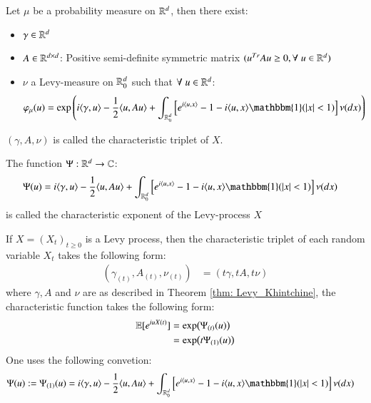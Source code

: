 \begin{theorem}
\label{thm: Levy_Khintchine}
Let $\mu$ be a probability measure on $\mathbb{R}^{d}$, then there exist: 
\begin{itemize}[leftmargin =*]
    \item $\gamma \in \mathbb{R}^{d}$
    \item $A \in \mathbb{R}^{d\times d}$: Positive semi-definite symmetric matrix $(u^{Tr}Au \geq 0, \forall\; u\in \mathbb{R}^{d})$ 
    \item $\nu$ a Levy-measure on $\mathbb{R}_{0}^{d}$ such that $\forall \; u \in \mathbb{R}^{d}$: 
    \begin{align*}
    \varphi_{\mu}(u) &= \exp\left(
    i\langle \gamma, u \rangle - \frac{1}{2}\langle u, Au \rangle 
    + \int_{\R_{0}^{d}}\left[
    e^{i \langle u, x\rangle} - 1 - i\langle u, x\rangle\mathbbm{1}(|x|<1)
    \right]\nu(dx)
    \right)
    \end{align*}
\end{itemize}
$(\gamma, A, \nu)$ is called the characteristic triplet of $X$. 
\end{theorem} 

\newpage 

\begin{definition}
The function $\Psi: \mathbb{R}^{d} \to \mathbb{C}$: 
\begin{align*}
\Psi(u) &= i\langle \gamma, u \rangle - \frac{1}{2}\langle u, Au \rangle 
    + \int_{\R_{0}^{d}}\left[
    e^{i \langle u, x\rangle} - 1 - i\langle u, x\rangle\mathbbm{1}(|x|<1)
    \right]\nu(dx)    
\end{align*}
is called the characteristic exponent of the Levy-process $X$
\end{definition}


\begin{theorem}
If $X = (X_{t})_{t\geq 0}$ is a Levy process, then the characteristic triplet of each random variable $X_{t}$ takes the following form: 
\begin{align*}
(\gamma_{(t)}, A_{(t)}, \nu_{(t)})
&= 
(t\gamma, tA, t\nu)
\end{align*}
where $\gamma, A$ and $\nu$ are as described in Theorem \ref{thm: Levy_Khintchine}, the characteristic function takes the following form: 
\begin{align*}
\mathbb{E}[e^{iuX(t)}] &= \exp(\Psi_{(t)}(u)) \\ 
 &= \exp(t\Psi_{(1)}(u))
\end{align*}
One uses the following convetion: 
\begin{align*}
\Psi(u):= \Psi_{(1)}(u) 
&= 
i\langle \gamma, u \rangle - 
\frac{1}{2}\langle u, Au \rangle 
+ \int_{\R_{0}^{d}}\left[
e^{i \langle u, x\rangle} - 1 - i\langle u, x\rangle\mathbbm{1}(|x|<1)
\right]\nu(dx)  
\end{align*}
\end{theorem}


